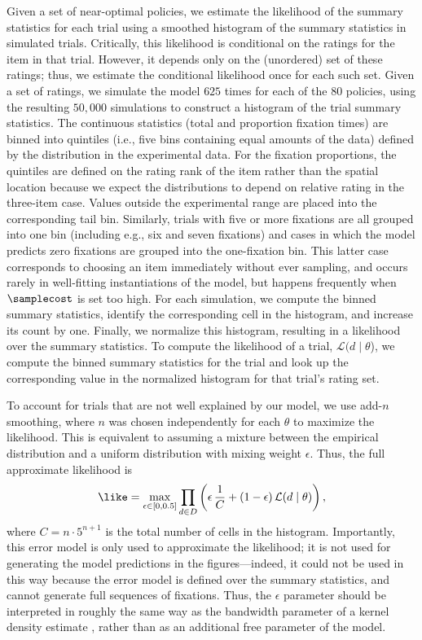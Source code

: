 Given a set of near-optimal policies, we estimate the likelihood of the summary statistics for each trial using a smoothed histogram of the summary statistics in simulated trials. Critically, this likelihood is conditional on the ratings for the item in that trial. However, it depends only on the (unordered) set of these ratings; thus, we estimate the conditional likelihood once for each such set. Given a set of ratings, we simulate the model $625$ times for each of the $80$ policies, using the resulting $50{,}000$ simulations to construct a histogram of the trial summary statistics. The continuous statistics (total and proportion fixation times) are binned into quintiles (i.e., five bins containing equal amounts of the data) defined by the distribution in the experimental data. For the fixation proportions, the quintiles are defined on the rating rank of the item rather than the spatial location because we expect the distributions to depend on relative rating in the three-item case. Values outside the experimental range are placed into the corresponding tail bin. Similarly, trials with five or more fixations are all grouped into one bin (including e.g., six and seven fixations) and cases in which the model predicts zero fixations are grouped into the one-fixation bin. This latter case corresponds to choosing an item immediately without ever sampling, and occurs  rarely in well-fitting instantiations of the model, but happens frequently when $\samplecost$ is set too high. For each simulation, we compute the binned summary statistics, identify the corresponding cell in the histogram, and increase its count by one. Finally, we normalize this histogram, resulting in a likelihood over the summary statistics. To compute the likelihood of a trial, $\mathcal{L}(d \mid \theta$), we compute the binned summary statistics for the trial and look up the corresponding value in the normalized histogram for that trial's rating set.

 
To account for trials that are not well explained by our model, we use add-$n$ smoothing, where $n$ was chosen independently for each $\theta$ to maximize the likelihood. This is equivalent to assuming a mixture between the empirical distribution and a uniform distribution with mixing weight $\epsilon$. Thus, the full approximate likelihood is
\[
\like = \max_{\epsilon\in[0,0.5]} 
  \prod_{d\in D} \left( 
    \epsilon\,\frac{1}{C}+(1-\epsilon)\,\mathcal{L}(d\mid\theta) 
  \right),
\]
where $C=n\cdot5^{n+1}$ is the total number of cells in the histogram. Importantly, this error model is only used to approximate the likelihood; it is not used for generating the model predictions in the figures---indeed, it could not be used in this way because the error model is defined over the summary statistics, and cannot generate full sequences of fixations. Thus, the $\epsilon$ parameter should be interpreted in roughly the same way as the bandwidth parameter of a kernel density estimate \citep{turner2014generalized}, rather than as an additional free parameter of the model.


